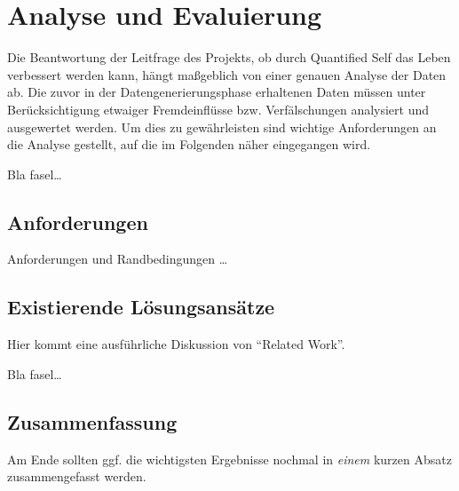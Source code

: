 
\chapter{Analyse und Evaluierung}
\label{ch:AnalyseUndEvaluierung}

Die Beantwortung der Leitfrage des Projekts, ob durch Quantified Self das Leben verbessert werden kann, hängt maßgeblich von einer genauen Analyse der Daten ab. 
Die zuvor in der Datengenerierungsphase erhaltenen Daten müssen unter Berücksichtigung etwaiger Fremdeinflüsse bzw. Verfälschungen analysiert und ausgewertet werden.
Um dies zu gewährleisten sind wichtige Anforderungen an die Analyse gestellt, auf die im Folgenden näher eingegangen wird.


Bla fasel\ldots

\section{Anforderungen}
\label{ch:AnalyseUndEvaluierung:sec:Anforderungen}
Anforderungen und Randbedingungen \ldots

\section{Existierende Lösungsansätze}
\label{ch:AnalyseUndEvaluierung:sec:RelatedWork}

Hier kommt eine ausführliche Diskussion
von "`Related Work"'.

Bla fasel\ldots

\section{Zusammenfassung}
\label{ch:Analyse:sec:zusammenfassung}

Am Ende sollten ggf. die wichtigsten Ergebnisse nochmal in \emph{einem}
kurzen Absatz zusammengefasst werden.

